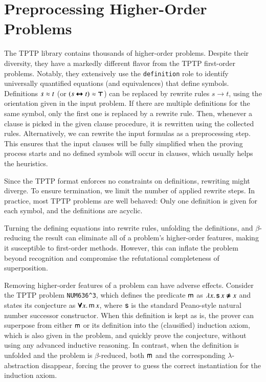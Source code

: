 \section{Preprocessing Higher-Order Problems}
\label{sec:ho-tech:preprocessing}

The TPTP library contains thousands of higher-order problems. Despite their
diversity, they have a markedly different flavor from the TPTP first-order
problems. Notably, they extensively use the \verb|definition| role to identify
universally quantified equations (and equivalences) that define symbols.
%
Definitions $s \approx t$ (or $(s \pmb{\leftrightarrow} t) \approx \pmb{\top}$) can be replaced by rewrite
rules $s \longrightarrow t$,
using the orientation given in the input problem. If there are multiple
definitions for the same symbol, only the first one is replaced by a rewrite rule.
Then, whenever a clause is picked in the given clause procedure, it is rewritten
using the collected rules.
Alternatively, we can rewrite
the input formulas as a preprocessing step. This ensures that the input
clauses will be fully simplified when the proving process starts and no
defined symbols will occur in clauses, which usually helps the heuristics.

Since the TPTP format enforces no constraints on
definitions, rewriting might diverge. To ensure
termination, we limit the number of applied rewrite steps. In
practice, most TPTP problems are well behaved: Only one
definition is given for each symbol, and the definitions are acyclic.

Turning the defining equations into rewrite rules, unfolding the definitions, and
$\beta$-reduc\-ing the result can eliminate all of a problem's higher-order features, making
it susceptible to first-order methods. However, this can inflate the problem
beyond recognition and compromise the refutational completeness of
superposition.

\begin{exa}
  \label{hot:exa:num636}
  Removing higher-order features of a problem can have adverse effects.
  Consider the TPTP problem \texttt{NUM636\^{}3}, which defines the predicate $\mathsf{m}$
  as $\lambda x.\, \mathsf{s} \, x \pmb{\not\approx} x$ and states its conjecture as $\pmb{\forall}
  x.\, \mathsf{m} \, x $, where $\mathsf{s}$ is the standard Peano-style natural number
  successor constructor. When this definition is kept as is, the
  prover can superpose from either $\mathsf{m}$ or its definition into the
  (clausified) induction axiom, which is also given in the problem, and quickly prove
  the conjecture, without using any advanced inductive reasoning. In contrast,
  when the definition is
  unfolded and the problem is $\beta$-reduced, both $\mathsf{m}$ and the
  corresponding $\lambda$-abstraction disappear, forcing the prover to guess the
  correct instantiation for the induction axiom.
\end{exa}

